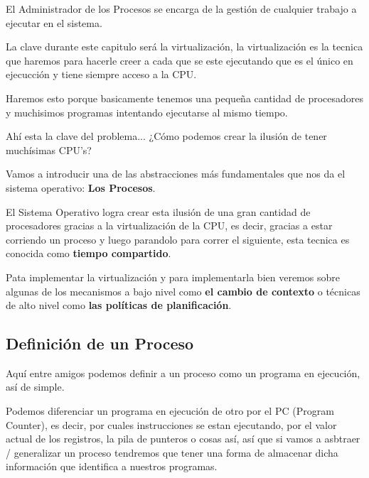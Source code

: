 \documentclass[12pt, fleqn]{report}                             %
\newcommand \Quote {\qq}                                        %
\begin{document}
                El Administrador de los Procesos se encarga de la gestión de cualquier trabajo
                a ejecutar en el sistema.

                La clave durante este capitulo será la virtualización, la virtualización es
                la tecnica que haremos para hacerle creer a cada \Quote{programa} que se este
                ejecutando que es el único en ejecucción y tiene siempre acceso a la CPU.


                Haremos esto porque basicamente tenemos una pequeña cantidad de procesadores y 
                muchisimos programas intentando ejecutarse al mismo tiempo.

                Ahí esta la clave del problema... ¿Cómo podemos crear la ilusión de tener
                muchísimas CPU's?

                Vamos a introducir una de las abstracciones más fundamentales que nos da el 
                sistema operativo: \textbf{Los Procesos}.

                El Sistema Operativo logra crear esta ilusión de una gran cantidad de procesadores
                gracias a la virtualización de la CPU, es decir, gracias a estar corriendo un proceso
                y luego parandolo para correr el siguiente, esta tecnica es conocida como \textbf{
                tiempo compartido}.

                Pata implementar la virtualización y para implementarla bien veremos sobre algunas
                de los mecanismos a bajo nivel como \textbf{el cambio de contexto} o técnicas de 
                alto nivel como \textbf{las políticas de planificación}.

            \clearpage
            \subsection{Definición de un Proceso}

                Aquí entre amigos podemos definir a un proceso como un programa en ejecución,
                así de simple.

                Podemos diferenciar un programa en ejecución de otro por el PC (Program Counter),
                es decir, por cuales instrucciones se estan ejecutando, por el valor actual de los
                registros, la pila de punteros o cosas así, así que si vamos a asbtraer / generalizar
                un proceso tendremos que tener una forma de almacenar dicha información que identifica
                a nuestros programas.
\end{document}
